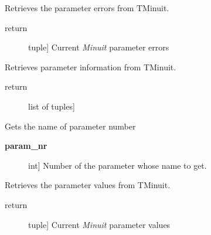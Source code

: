 \documentclass[a4paper,10pt,english]{sphinxmanual}
\begin{document}
\begin{fulllineitems}
\begin{fulllineitems}
\begin{description}
\end{description}

\end{fulllineitems}


\begin{fulllineitems}
\label{index:kafe.minuit.Minuit.get_parameter_errors}
Retrieves the parameter errors from TMinuit.
\begin{description}
\item[{return}] \leavevmode{[}tuple{]}
Current \emph{Minuit} parameter errors

\end{description}

\end{fulllineitems}


\begin{fulllineitems}
\label{index:kafe.minuit.Minuit.get_parameter_info}
Retrieves parameter information from TMinuit.
\begin{description}
\item[{return}] \leavevmode{[}list of tuples{]}

\end{description}

\end{fulllineitems}


\begin{fulllineitems}
\label{index:kafe.minuit.Minuit.get_parameter_name}
Gets the name of parameter number 
\begin{description}
\item[{\textbf{param\_nr}}] \leavevmode{[}int{]}
Number of the parameter whose name to get.

\end{description}

\end{fulllineitems}


\begin{fulllineitems}
\label{index:kafe.minuit.Minuit.get_parameter_values}
Retrieves the parameter values from TMinuit.
\begin{description}
\item[{return}] \leavevmode{[}tuple{]}
Current \emph{Minuit} parameter values


\end{description}
\end{fulllineitems}
\end{fulllineitems}
\end{document}
